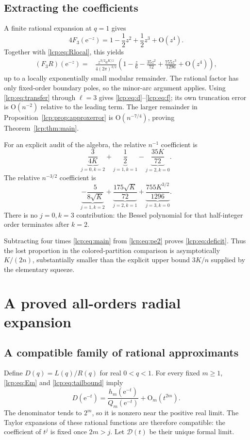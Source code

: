\documentclass[11pt]{article}
\numberwithin{equation}{section}
\theoremstyle{definition}\newtheorem{definition}[theorem]{Definition}
\theoremstyle{remark}\newtheorem{remark}[theorem]{Remark}
\newcommand{\OO}{\mathrm O}
\newcommand{\ee}{\mathrm e}
\begin{document}
\subsection{Extracting the coefficients}
A finite rational expansion at $q=1$ gives
\[
 4F_3(\ee^{-z})=1-\frac12z^2+\frac12z^3+\OO(z^4).
\]
Together with \eqref{lcp:eq:Rlocal}, this yields
\begin{align}\label{lcp:eq:locals}
 (F_3R)(\ee^{-z})={}&
 \frac{z^{3/2}\ee^{K/z}}{4(2\pi)^{3/2}}
 \left(1-\frac z6-\frac{35z^2}{72}
                +\frac{755z^3}{1296}+\OO(z^4)\right),
\end{align}
up to a locally exponentially small modular remainder.
The rational factor has only fixed-order boundary poles, so the minor-arc
argument applies. Using \eqref{lcp:eq:transfer} through $\ell=3$ gives
\eqref{lcp:eq:d}--\eqref{lcp:eq:f}; its own truncation error is $\OO(n^{-2})$
relative to the leading term. The larger remainder in
Proposition~\ref{lcp:prop:approxerror} is $\OO(n^{-7/4})$, proving
Theorem~\ref{lcp:thm:main}.

For an explicit audit of the algebra, the relative $n^{-1}$ coefficient is
\[
 \underbrace{\frac{3}{4K}}_{j=0,k=2}
 +\underbrace{\frac12}_{j=1,k=1}
 -\underbrace{\frac{35K}{72}}_{j=2,k=0}.
\]
The relative $n^{-3/2}$ coefficient is
\[
 \underbrace{-\frac{5}{8\sqrt K}}_{j=1,k=2}
 +\underbrace{\frac{175\sqrt K}{72}}_{j=2,k=1}
 +\underbrace{\frac{755K^{3/2}}{1296}}_{j=3,k=0}.
\]
There is no $j=0,k=3$ contribution: the Bessel polynomial for that
half-integer order terminates after $k=2$.

Subtracting four times \eqref{lcp:eq:main} from \eqref{lcp:eq:pe2} proves
\eqref{lcp:eq:deficit}. Thus the lost proportion in the colored-partition
comparison is asymptotically $K/(2n)$, substantially smaller than the
explicit upper bound $3K/n$ supplied by the elementary squeeze.

\section{A proved all-orders radial expansion}
\subsection{A compatible family of rational approximants}
Define $D(q)=L(q)/R(q)$ for real $0<q<1$.
For every fixed $m\ge1$, \eqref{lcp:eq:Em} and \eqref{lcp:eq:tailbound} imply
\begin{equation}\label{lcp:eq:Dapprox}
 D(\ee^{-t})=\frac{h_m(\ee^{-t})}{Q_m(\ee^{-t})}
                       +\OO_m(t^{2m}).
\end{equation}
The denominator tends to $2^m$, so it is nonzero near the positive real
limit. The Taylor expansions of these rational functions are therefore
compatible: the coefficient of $t^j$ is fixed once $2m>j$.
Let $\mathcal D(t)$ be their unique formal limit.
\end{document}
